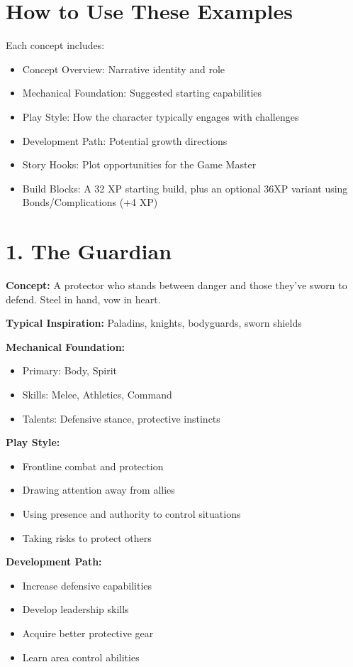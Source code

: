 \documentclass[11pt,twoside,openany]{book}
\begin{document}
\section*{How to Use These Examples} 

Each concept includes:
\begin{itemize}
\item Concept Overview: Narrative identity and role
\item Mechanical Foundation: Suggested starting capabilities
\item Play Style: How the character typically engages with challenges
\item Development Path: Potential growth directions
\item Story Hooks: Plot opportunities for the Game Master
\item Build Blocks: A 32 XP starting build, plus an optional 36XP variant using Bonds/Complications (+4 XP)
\end{itemize}

\section*{1. The Guardian} 

\textbf{Concept:} A protector who stands between danger and those they've sworn to defend. Steel in hand, vow in heart.

\textbf{Typical Inspiration:} Paladins, knights, bodyguards, sworn shields

\textbf{Mechanical Foundation:}
\begin{itemize}
\item Primary: Body, Spirit
\item Skills: Melee, Athletics, Command
\item Talents: Defensive stance, protective instincts
\end{itemize}

\textbf{Play Style:}
\begin{itemize}
\item Frontline combat and protection
\item Drawing attention away from allies
\item Using presence and authority to control situations
\item Taking risks to protect others
\end{itemize}

\textbf{Development Path:}
\begin{itemize}
\item Increase defensive capabilities
\item Develop leadership skills
\item Acquire better protective gear
\item Learn area control abilities
\end{itemize}
\end{document}
